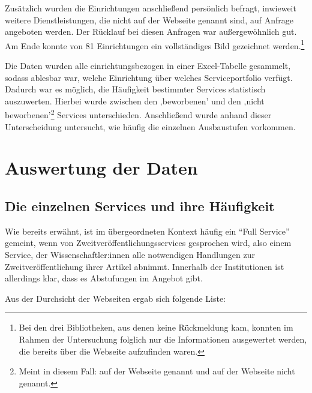 \documentclass[a4paper,
fontsize=11pt,
oneside,
numbers=noperiodatend,
parskip=half-,
bibliography=totoc,
final
]{scrartcl}
\begin{document}
Zusätzlich wurden die Einrichtungen anschließend persönlich befragt,
inwieweit weitere Dienstleistungen, die nicht auf der Webseite genannt
sind, auf Anfrage angeboten werden. Der Rücklauf bei diesen Anfragen war
außergewöhnlich gut. Am Ende konnte von 81 Einrichtungen ein
vollständiges Bild gezeichnet werden.\footnote{Bei den drei
  Bibliotheken, aus denen keine Rückmeldung kam, konnten im Rahmen der
  Untersuchung folglich nur die Informationen ausgewertet werden, die
  bereits über die Webseite aufzufinden waren.}

Die Daten wurden alle einrichtungsbezogen in einer Excel-Tabelle
gesammelt, sodass ablesbar war, welche Einrichtung über welches
Serviceportfolio verfügt. Dadurch war es möglich, die Häufigkeit
bestimmter Services statistisch auszuwerten. Hierbei wurde zwischen den
‚beworbenen' und den ‚nicht beworbenen'\footnote{Meint in diesem Fall:
  auf der Webseite genannt und auf der Webseite nicht genannt.} Services
unterschieden. Anschließend wurde anhand dieser Unterscheidung
untersucht, wie häufig die einzelnen Ausbaustufen vorkommen.

\hypertarget{auswertung-der-daten}{%
\section{Auswertung der Daten}\label{auswertung-der-daten}}

\hypertarget{die-einzelnen-services-und-ihre-huxe4ufigkeit}{%
\subsection{Die einzelnen Services und ihre
Häufigkeit}\label{die-einzelnen-services-und-ihre-huxe4ufigkeit}}

Wie bereits erwähnt, ist im übergeordneten Kontext häufig ein
\enquote{Full Service} gemeint, wenn von Zweitveröffentlichungsservices
gesprochen wird, also einem Service, der Wissenschaftler:innen alle
notwendigen Handlungen zur Zweitveröffentlichung ihrer Artikel abnimmt.
Innerhalb der Institutionen ist allerdings klar, dass es Abstufungen im
Angebot gibt.

Aus der Durchsicht der Webseiten ergab sich folgende Liste:
\end{document}

